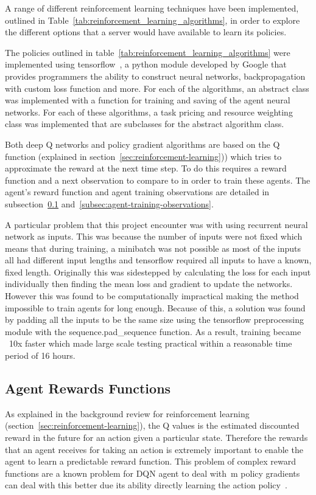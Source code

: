A range of different reinforcement learning techniques have been implemented, outlined in
Table~\ref{tab:reinforcement_learning_algorithms}, in order to explore the different options that a server would have
available to learn its policies.

The policies outlined in table~\ref{tab:reinforcement_learning_algorithms} were implemented using
tensorflow~\citep{tensorflow2015-whitepaper}, a python module developed by Google
that provides programmers the ability to construct neural networks, backpropagation with custom loss function and more.
For each of the algorithms, an abstract class was implemented with a function for training and saving of the agent
neural networks. For each of these algorithms, a task pricing and resource weighting class was implemented that are
subclasses for the abstract algorithm class.

Both deep Q networks and policy gradient algorithms are based on the Q function (explained in
section~\ref{sec:reinforcement-learning})) which tries to approximate the reward at the next time step. To do
this requires a reward function and a next observation to compare to in order to train these agents. The agent's
reward function and agent training observations are detailed in subsection~\ref{subsec:agent-rewards-functions}
and~\ref{subsec:agent-training-observations}.

A particular problem that this project encounter was with using recurrent neural network as inputs. This was because the
number of inputs were not fixed which means that during training, a minibatch was not possible as most of the inputs
all had different input lengths and tensorflow required all inputs to have a known, fixed length. Originally this was
sidestepped by calculating the loss for each input individually then finding the mean loss and gradient to update the
networks. However this was found to be computationally impractical making the method impossible to train agents for
long enough. Because of this, a solution was found by padding all the inputs to be the same size using the
tensorflow preprocessing module with the sequence.pad\_sequence function. As a result, training became ~10x faster
which made large scale testing practical within a reasonable time period of 16 hours.

\subsection{Agent Rewards Functions}\label{subsec:agent-rewards-functions}
As explained in the background review for reinforcement learning (section~\ref{sec:reinforcement-learning}),
the Q values is the estimated discounted reward in the future for an action given a particular state. Therefore the
rewards that an agent receives for taking an action is extremely important to enable the agent to learn a predictable
reward function. This problem of complex reward functions are a known problem for DQN agent to deal with~\citep{atari}m
policy gradients can deal with this better due its ability directly learning the action policy~\citep{Sutton1998}.

